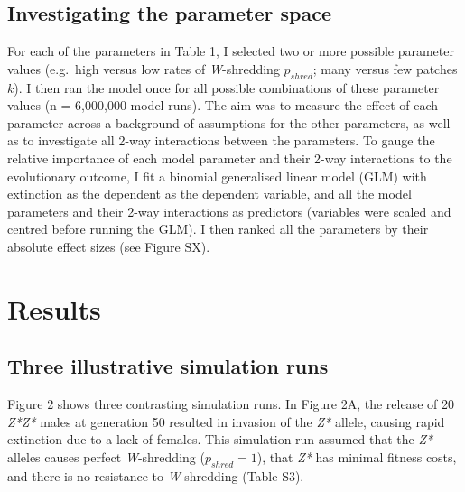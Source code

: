 \documentclass[]{rsos}%
\begin{document}
\hypertarget{investigating-the-parameter-space}{%
\subsection{Investigating the parameter
space}\label{investigating-the-parameter-space}}

For each of the parameters in Table 1, I selected two or more possible
parameter values (e.g.~high versus low rates of \emph{W}-shredding
\(p_{shred}\); many versus few patches \(k\)). I then ran the model once
for all possible combinations of these parameter values (n = 6,000,000
model runs). The aim was to measure the effect of each parameter across
a background of assumptions for the other parameters, as well as to
investigate all 2-way interactions between the parameters. To gauge the
relative importance of each model parameter and their 2-way interactions
to the evolutionary outcome, I fit a binomial generalised linear model
(GLM) with extinction as the dependent as the dependent variable, and
all the model parameters and their 2-way interactions as predictors
(variables were scaled and centred before running the GLM). I then
ranked all the parameters by their absolute effect sizes (see Figure
SX).

\hypertarget{results}{%
\section{Results}\label{results}}

\hypertarget{three-illustrative-simulation-runs}{%
\subsection{Three illustrative simulation
runs}\label{three-illustrative-simulation-runs}}

Figure 2 shows three contrasting simulation runs. In Figure 2A, the
release of 20 \emph{Z*Z*} males at generation 50 resulted in invasion of
the \emph{Z*} allele, causing rapid extinction due to a lack of females.
This simulation run assumed that the \emph{Z*} alleles causes perfect
\emph{W}-shredding (\(p_{shred} = 1\)), that \emph{Z*} has minimal
fitness costs, and there is no resistance to \emph{W}-shredding (Table
S3).
\end{document}
